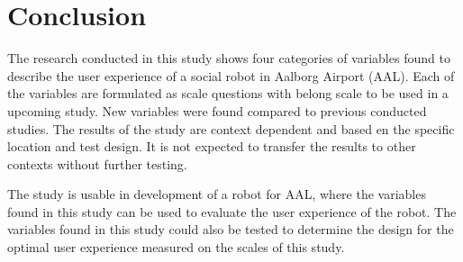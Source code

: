 \section{Conclusion}
\label{Conclusion}
The research conducted in this study shows four categories of variables found to describe the user experience of a social robot in Aalborg Airport (AAL). Each of the variables are formulated as scale questions with belong scale to be used in a upcoming study. New variables were found compared to previous conducted studies. The results of the study are context dependent and based en the specific location and test design. It is not expected to transfer the results to other contexts without further testing. 

The study is usable in development of a robot for AAL, where the variables found in this study can be used to evaluate the user experience of the robot. The variables found in this study could also be tested to determine the design for the optimal user experience measured on the scales of this study. 



